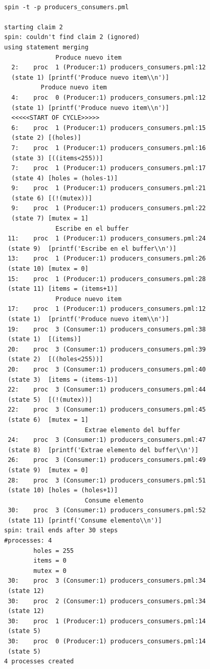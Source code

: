 \documentclass[a4paper,12pt]{article}
\begin{document}
\begin{lstlisting}[frame=single]  % Start your code-block

spin -t -p producers_consumers.pml

starting claim 2
spin: couldn't find claim 2 (ignored)
using statement merging
              Produce nuevo item
  2:	proc  1 (Producer:1) producers_consumers.pml:12 
  (state 1)	[printf('Produce nuevo item\\n')]
          Produce nuevo item
  4:	proc  0 (Producer:1) producers_consumers.pml:12 
  (state 1)	[printf('Produce nuevo item\\n')]
  <<<<<START OF CYCLE>>>>>
  6:	proc  1 (Producer:1) producers_consumers.pml:15 
  (state 2)	[(holes)]
  7:	proc  1 (Producer:1) producers_consumers.pml:16 
  (state 3)	[((items<255))]
  7:	proc  1 (Producer:1) producers_consumers.pml:17 
  (state 4)	[holes = (holes-1)]
  9:	proc  1 (Producer:1) producers_consumers.pml:21 
  (state 6)	[(!(mutex))]
  9:	proc  1 (Producer:1) producers_consumers.pml:22 
  (state 7)	[mutex = 1]
              Escribe en el buffer
 11:	proc  1 (Producer:1) producers_consumers.pml:24 
 (state 9)	[printf('Escribe en el buffer\\n')]
 13:	proc  1 (Producer:1) producers_consumers.pml:26 
 (state 10)	[mutex = 0]
 15:	proc  1 (Producer:1) producers_consumers.pml:28 
 (state 11)	[items = (items+1)]
              Produce nuevo item
 17:	proc  1 (Producer:1) producers_consumers.pml:12 
 (state 1)	[printf('Produce nuevo item\\n')]
 19:	proc  3 (Consumer:1) producers_consumers.pml:38 
 (state 1)	[(items)]
 20:	proc  3 (Consumer:1) producers_consumers.pml:39 
 (state 2)	[((holes<255))]
 20:	proc  3 (Consumer:1) producers_consumers.pml:40 
 (state 3)	[items = (items-1)]
 22:	proc  3 (Consumer:1) producers_consumers.pml:44 
 (state 5)	[(!(mutex))]
 22:	proc  3 (Consumer:1) producers_consumers.pml:45 
 (state 6)	[mutex = 1]
                      Extrae elemento del buffer
 24:	proc  3 (Consumer:1) producers_consumers.pml:47 
 (state 8)	[printf('Extrae elemento del buffer\\n')]
 26:	proc  3 (Consumer:1) producers_consumers.pml:49 
 (state 9)	[mutex = 0]
 28:	proc  3 (Consumer:1) producers_consumers.pml:51 
 (state 10)	[holes = (holes+1)]
                      Consume elemento
 30:	proc  3 (Consumer:1) producers_consumers.pml:52 
 (state 11)	[printf('Consume elemento\\n')]
spin: trail ends after 30 steps
#processes: 4
		holes = 255
		items = 0
		mutex = 0
 30:	proc  3 (Consumer:1) producers_consumers.pml:34 
 (state 12)
 30:	proc  2 (Consumer:1) producers_consumers.pml:34 
 (state 12)
 30:	proc  1 (Producer:1) producers_consumers.pml:14 
 (state 5)
 30:	proc  0 (Producer:1) producers_consumers.pml:14 
 (state 5)
4 processes created
\end{lstlisting}
\end{document}

